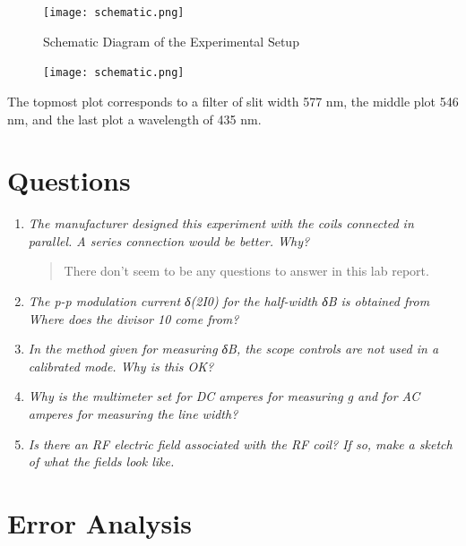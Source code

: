 \documentclass{amsart}
\begin{document}
\begin{figure}
    \centering
    \texttt{[image: schematic.png]}
    \caption{Schematic Diagram of the Experimental Setup}
\end{figure}


\begin{figure}
    \begin{minipage}{.45\textwidth}
        \texttt{[image: schematic.png]}
    \end{minipage}
    \begin{minipage}{.45\textwidth}

    \end{minipage}
\end{figure}

The topmost plot corresponds to a filter of slit width 577 nm, the middle plot 546 nm, and the last plot a wavelength of 435 nm.
\section{Questions}

\begin{enumerate}
    \item {\textit{The manufacturer designed this experiment with the coils connected in parallel. A series connection would be better. Why?}
    \begin{quote}
        There don't seem to be any questions to answer in this lab report.
    \end{quote}}
    \item {\textit{The p-p modulation current δ(2I0) for the half-width δB is obtained from  Where does the divisor 10 come from?}
    \begin{quote}

    \end{quote}}
    \item {\textit{In the method given for measuring δB, the scope controls are not used in a calibrated mode. Why is this OK?}
    \begin{quote}

    \end{quote}}
    \item {\textit{Why is the multimeter set for DC amperes for measuring g and for AC amperes for measuring the line width?}
    \begin{quote}

    \end{quote}}
    \item {\textit{Is there an RF electric field associated with the RF coil? If so, make a sketch of what the fields look like.}
    \begin{quote}

    \end{quote}}



\end{enumerate}

\section{Error Analysis}
\end{document}
